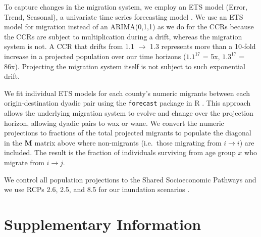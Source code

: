 \documentclass[12pt]{article}
\begin{document}
To capture changes in the migration system, we employ an ETS model
(Error, Trend, Seasonal), a univariate time series forecasting model
\citep{hyndman2008forecasting}. We use an ETS model for migration
instead of an ARIMA(0,1,1) as we do for the CCRs because the CCRs are
subject to multiplication during a drift, whereas the migration system
is not. A CCR that drifts from 1.1 \(\rightarrow\) 1.3 represents more
than a 10-fold increase in a projected population over our time horizons
(\(1.1^{17}\) = 5x, \(1.3^{17}\) = 86x). Projecting the migration system
itself is not subject to such exponential drift.

We fit individual ETS models for each county's numeric migrants between
each origin-destination dyadic pair using the \texttt{forecast} package
in R \citep{Rforecast}. This approach allows the underlying migration
system to evolve and change over the projection horizon, allowing dyadic
pairs to wax or wane. We convert the numeric projections to fractions of
the total projected migrants to populate the diagonal in the
\(\mathbf{M}\) matrix above where non-migrants (i.e.~those migrating
from \(i\rightarrow i\)) are included. The result is the fraction of
individuals surviving from age group \(x\) who migrate from
\(i\rightarrow j\).

We control all population projections to the Shared Socioeconomic
Pathways \citep{samir2017human} and we use RCPs 2.6, 2.5, and 8.5 for
our inundation scenarios \citep{koppProbabilistic21st22nd2014}.

\clearpage

\hypertarget{supplementary-information}{%
\section{Supplementary Information}\label{supplementary-information}}
\end{document}

